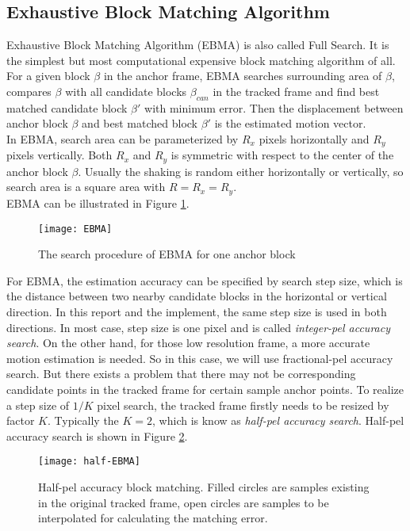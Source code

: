 \documentclass[a4paper, twocolumn]{article}
\begin{document}
	\subsection{Exhaustive Block Matching Algorithm}
	Exhaustive Block Matching Algorithm (EBMA) is also called Full Search. It is the simplest but most computational expensive block matching algorithm of all.\\
	For a given block $ \beta $ in the anchor frame, EBMA searches surrounding area of $ \beta $, compares $ \beta $ with all candidate blocks $ \beta_{can} $ in the tracked frame and find best matched candidate block $ \beta' $ with minimum error. Then the displacement between anchor block $ \beta $ and best matched block $ \beta' $ is the estimated motion vector. \\
	In EBMA, search area can be parameterized by $ R_x $ pixels horizontally and $ R_y $ pixels vertically. Both $ R_x $ and $ R_y $ is symmetric with respect to the center of the anchor block $ \beta $. Usually the shaking is random either horizontally or vertically, so search area is a square area with $ R  = R_x = R_y $. \\
	EBMA can be illustrated in Figure \ref{fig:EBMA}. \\
	\begin{figure}[h]
	\centering
	\texttt{[image: EBMA]}
	\caption[EBMA figure]{The search procedure of EBMA for one anchor block}
	\label{fig:EBMA}
	\end{figure}
	
	\noindent
	For EBMA, the estimation accuracy can be specified by search step size, which is the distance between two nearby candidate blocks in the horizontal or vertical direction. 
	In this report and the implement, the same step size is used in both directions. In most case, step size is one pixel and is called \textit{integer-pel accuracy search}. On the other hand, for those low resolution frame, a more accurate motion estimation is needed. So in this case, we will use fractional-pel accuracy search. But there exists a problem that there may not be corresponding candidate points in the tracked frame for certain sample anchor points. To realize a step size of $ 1/K $ pixel search, the tracked frame firstly needs to be resized by factor $ K $. Typically the $ K = 2 $, which is know as \textit{half-pel accuracy search}. Half-pel accuracy search is shown in Figure \ref{fig:half-EBMA}.
	\begin{figure}[h]
	\centering
	\texttt{[image: half-EBMA]}
	\caption[half EBMA]{Half-pel accuracy block matching. Filled circles are samples existing in the original tracked frame, open circles are samples to be interpolated for calculating the matching error.}
	\label{fig:half-EBMA}
	\end{figure}
	
\end{document}
